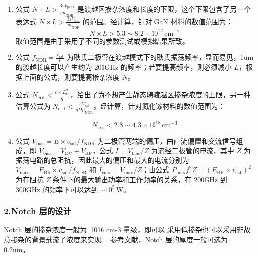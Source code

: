 \documentclass[12pt,hyperref,a4paper,UTF8]{ctexart}
\begin{document}
\begin{enumerate}
    \item 公式 $N \times L > \frac{3\varepsilon V_{\text{peak}}}{q\mu_{\text{NDR}}}$ 是渡越区掺杂浓度和长度的下限，这个下限包含了另一个表达式 $N \times L > \frac{3\varepsilon V_{\text{sat}}}{q\mu_{\text{NDR}}}$ 的范围。经计算，针对 GaN 材料的数值范围为：
    \begin{equation}
    N \times L > 5.3 \sim 8.2 \times 10^{12} \, \text{cm}^{-2} 
    \end{equation}
    取值范围是由于采用了不同的参数测试或模拟结果所致。
    
    \item 公式 $f_{\text{NDR}} = \frac{V_{\text{sat}}}{L}$ 为耿氏二极管在渡越模式下的耿氏振荡频率，显而易见，1um 的渡越长度可以产生约为 200GHz 的频率；若要提高频率，则必须减小 $L$，根据上面的公式，则要提高掺杂浓度 $N$。
    
    \item 公式 $N_{\text{crit}} < \frac{\varepsilon \times E_{\text{th}}^2}{q}$，给出了为不想产生静态畴渡越区掺杂浓度的上限，另一种估算公式为 $N_{\text{crit}} < \frac{\varepsilon V_{\text{sat}}^2}{q D \mu_{\text{NDR}}}$。经计算，针对氮化镓材料的数值范围为：

\begin{equation}
N_{\text{crit}} < 2.8 \sim 4.3 \times 10^{18} \, \text{cm}^{-3}
\end{equation}

    \item 公式 $V_{\text{bias}} = E \times v_{\text{sat}} / f_{\text{NDR}}$ 为二极管两端的偏压，由直流偏置和交流信号组成，即 $V_{\text{bias}} = V_{\text{DC}} + V_{\text{RF}}$，公式 $I = V_{\text{bias}} / Z$ 为流经二极管的电流，其中 $Z$ 为振荡电路的总阻抗，因此最大的偏压和最大的电流分别为 $V_{\text{max}} = E_{\text{BR}} \times v_{\text{sat}} / f_{\text{NDR}}$ 和 $I_{\text{max}} = V_{\text{max}} / Z$；由公式 $P_{\text{max}} f^2 Z = (E_{\text{BR}} \times v_{\text{sat}})^2$ 为在阻抗 $Z$ 条件下的最大输出功率和工作频率的关系，在 200GHz 到 300GHz 的频率下可以达到 $\sim 10^5 \, \text{W}$。
\end{enumerate}

\subsubsection*{2.Notch 层的设计}
Notch 层的掺杂浓度一般为~1016 cm-3 量级，即可以
采用低掺杂也可以采用非故意掺杂的背景载流子浓度来实现。
参考文献，Notch 层的厚度一般可选为 0.2um。
\end{document}
